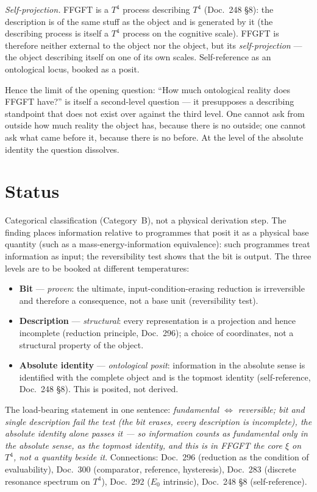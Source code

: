\emph{Self-projection.} FFGFT is a $T^4$ process describing $T^4$ (Doc.~248 §8):
the description is of the same stuff as the object and is generated by it (the
describing process is itself a $T^4$ process on the cognitive scale). FFGFT is
therefore neither external to the object nor the object, but its
\emph{self-projection} --- the object describing itself on one of its own scales.
Self-reference as an ontological locus, booked as a posit.

Hence the limit of the opening question: \enquote{How much ontological reality does
FFGFT have?} is itself a second-level question --- it presupposes a describing
standpoint that does not exist over against the third level. One cannot ask from
outside how much reality the object has, because there is no outside; one cannot ask
what came before it, because there is no before. At the level of the absolute
identity the question dissolves.

\section{Status}

Categorical classification (Category~B), not a physical derivation step. The
finding places information relative to programmes that posit it as a physical
base quantity (such as a mass-energy-information equivalence): such programmes
treat information as input; the reversibility test shows that the bit is output.
The three levels are to be booked at different temperatures:
\begin{itemize}
  \item \textbf{Bit} --- \emph{proven}: the ultimate, input-condition-erasing
    reduction is irreversible and therefore a consequence, not a base unit
    (reversibility test).
  \item \textbf{Description} --- \emph{structural}: every representation is a
    projection and hence incomplete (reduction principle, Doc.~296); a choice of
    coordinates, not a structural property of the object.
  \item \textbf{Absolute identity} --- \emph{ontological posit}: information in
    the absolute sense is identified with the complete object and is the topmost
    identity (self-reference, Doc.~248 §8). This is posited, not derived.
\end{itemize}
The load-bearing statement in one sentence: \emph{fundamental $\Leftrightarrow$
reversible; bit and single description fail the test (the bit erases, every
description is incomplete), the absolute identity alone passes it --- so
information counts as fundamental only in the absolute sense, as the topmost
identity, and this is in FFGFT the core $\xi$ on $T^4$, not a quantity beside
it}. Connections: Doc.~296 (reduction as the condition of evaluability),
Doc.~300 (comparator, reference, hysteresis), Doc.~283 (discrete resonance
spectrum on $T^4$), Doc.~292 ($E_0$ intrinsic), Doc.~248 §8 (self-reference).
